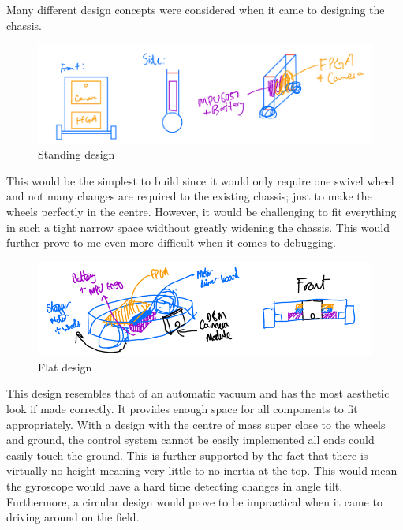 Many different design concepts were considered when it came to designing the chassis. 

\begin{figure}
    \centering
    \includegraphics[width=0.8\linewidth]{images/chassis-drawing1.png}
    \caption{Standing design}
\end{figure}

This would be the simplest to build since it would only require one swivel wheel and not many changes are required to the existing chassis; just to make the wheels perfectly in the centre. However, it would be challenging to fit everything in such a tight narrow space widthout greatly widening the chassis. This would further prove to me even more difficult when it comes to debugging.

\begin{figure}
    \centering
    \includegraphics[width=0.8\linewidth]{images/chassis-drawing2.png}
    \caption{Flat design}
\end{figure}

This design resembles that of an automatic vacuum and has the most aesthetic look if made correctly. It provides enough space for all components to fit appropriately. With a design with the centre of mass super close to the wheels and ground, the control system cannot be easily implemented all ends could easily touch the ground. This is further supported by the fact that there is virtually no height meaning very little to no inertia at the top. This would mean the gyroscope would have a hard time detecting changes in angle tilt. Furthermore, a circular design would prove to be impractical when it came to driving around on the field.

\vspace{1cm}


